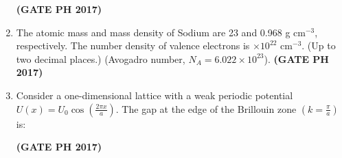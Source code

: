 \documentclass[14pt, a4paper]{extarticle}
\begin{document}
\begin{enumerate}[label=\textbf{Q.\arabic*}]
\begin{enumerate}
\end{enumerate}
\hfill \textbf{(GATE PH 2017)}

\item The atomic mass and mass density of Sodium are 23 and 0.968 g cm$^{-3}$, respectively. The number density of valence electrons is \underline{\hspace{3cm}} $\times 10^{22}$ cm$^{-3}$. (Up to two decimal places.) (Avogadro number, $N_A = 6.022 \times 10^{23}$).
\hfill \textbf{(GATE PH 2017)}

\item Consider a one-dimensional lattice with a weak periodic potential $U(x) = U_0 \cos\left(\frac{2\pi x}{a}\right)$. The gap at the edge of the Brillouin zone $\left(k = \frac{\pi}{a}\right)$ is:
\begin{enumerate}
\end{enumerate}
\hfill \textbf{(GATE PH 2017)}


\end{enumerate}
\end{document}
